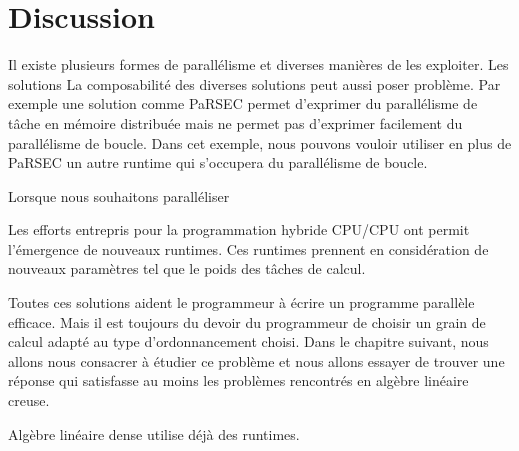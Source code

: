 \section{Discussion}
Il existe plusieurs formes de parallélisme et diverses manières de les exploiter.
%
Les solutions
%
La composabilité des diverses solutions peut aussi poser problème.
%
Par exemple une solution comme PaRSEC permet d'exprimer du parallélisme de tâche en mémoire distribuée mais ne permet pas d'exprimer facilement du parallélisme de boucle.
%
Dans cet exemple, nous pouvons vouloir utiliser en plus de PaRSEC un autre runtime qui s'occupera du parallélisme de boucle.
%



Lorsque nous souhaitons paralléliser



Les efforts entrepris pour la programmation hybride CPU/CPU ont permit l'émergence de nouveaux runtimes.
%
Ces runtimes prennent en considération de nouveaux paramètres tel que le poids des tâches de calcul.


Toutes ces solutions aident le programmeur à écrire un programme parallèle efficace.
%
Mais il est toujours du devoir du programmeur de choisir un grain de calcul adapté au type d'ordonnancement choisi.
%
Dans le chapitre suivant, nous allons nous consacrer à étudier ce problème et nous allons essayer de trouver une réponse qui satisfasse au moins les problèmes rencontrés en algèbre linéaire creuse.




Algèbre linéaire dense utilise déjà des runtimes.
